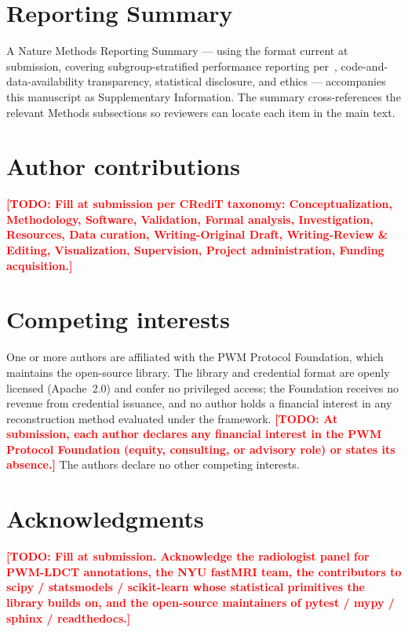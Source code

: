 \documentclass[twoside,11pt]{article}
\newcommand{\todo}[1]{\textcolor{red}{\textbf{[TODO: #1]}}}
\begin{document}
\section*{Reporting Summary}

A Nature Methods Reporting Summary --- using the format current at submission, covering subgroup-stratified performance reporting per~\citep{fda_aiml_2024}, code-and-data-availability transparency, statistical disclosure, and ethics --- accompanies this manuscript as Supplementary Information. The summary cross-references the relevant Methods subsections so reviewers can locate each item in the main text.

\section*{Author contributions}
\todo{Fill at submission per CRediT taxonomy: Conceptualization, Methodology, Software, Validation, Formal analysis, Investigation, Resources, Data curation, Writing-Original Draft, Writing-Review \& Editing, Visualization, Supervision, Project administration, Funding acquisition.}

\section*{Competing interests}
One or more authors are affiliated with the PWM Protocol Foundation, which maintains the open-source library. The library and credential format are openly licensed (Apache~2.0) and confer no privileged access; the Foundation receives no revenue from credential issuance, and no author holds a financial interest in any reconstruction method evaluated under the framework. \todo{At submission, each author declares any financial interest in the PWM Protocol Foundation (equity, consulting, or advisory role) or states its absence.} The authors declare no other competing interests.

\section*{Acknowledgments}
\todo{Fill at submission. Acknowledge the radiologist panel for PWM-LDCT annotations, the NYU fastMRI team, the contributors to scipy / statsmodels / scikit-learn whose statistical primitives the library builds on, and the open-source maintainers of pytest / mypy / sphinx / readthedocs.}
\end{document}
